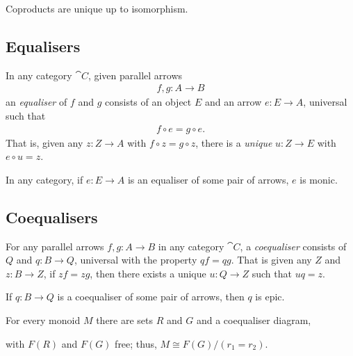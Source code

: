 \documentclass{article}
\begin{document}
\begin{proposition}[Awodey 3.12]
    Coproducts are unique up to isomorphism.
\end{proposition}

\subsection{Equalisers}

\begin{definition}
    In any category $\cat C$, given parallel arrows
    \begin{align*}
        f,g: A\to B
    \end{align*}
    an \emph{equaliser} of $f$ and $g$ consists of an object $E$ and an arrow $e:E\to A$,
    universal such that
    \begin{align*}
        f \circ e = g \circ e.
    \end{align*}
    That is, given any $z:Z\to A$ with $f\circ z=g\circ z$, there is a \emph{unique}
    $u:Z\to E$ with $e\circ u = z$.
\end{definition}

\begin{proposition}[Awodey 3.16]
    In any category, if $e:E\to A$ is an equaliser of some pair of arrows, $e$ is monic.
\end{proposition}

\subsection{Coequalisers}

\begin{definition}
    For any parallel arrows $f,g:A\to B$ in any category $\cat C$, a \emph{coequaliser}
    consists of $Q$ and $q:B\to Q$, universal with the property $qf=qg$. That is given
    any $Z$ and $z:B\to Z$, if $zf=zg$, then there exists a unique $u:Q\to Z$ such that
    $uq=z$.
\end{definition}

\begin{proposition}[Awodey 3.19]
    If $q:B\to Q$ is a coequaliser of some pair of arrows, then $q$ is epic.
\end{proposition}

\begin{proposition}[Awodey 3.24]
    For every monoid $M$ there are sets $R$ and $G$ and a coequaliser diagram,
    \begin{center}
    \end{center}
    with $F(R)$ and $F(G)$ free; thus, $M\cong F(G)/(r_1=r_2)$.
\end{proposition}
\end{document}
